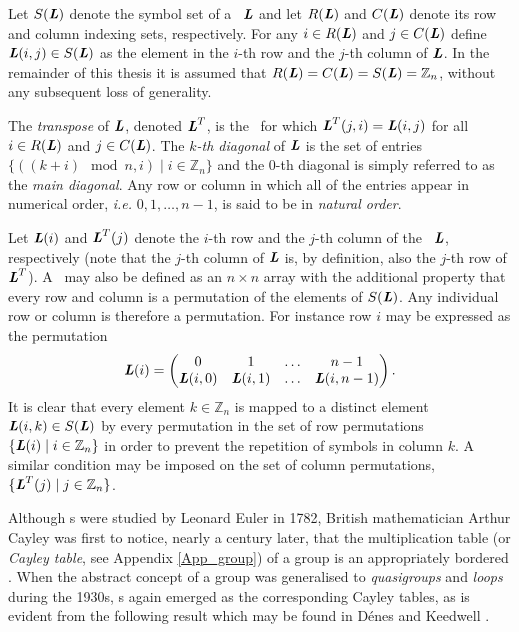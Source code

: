 Let $S(\mbox{\bf \emph{L}})$ denote the symbol set of a \lat \ $\mbox{\bf \emph{L}}$ and let  $R(\mbox{\bf \emph{L}})$ and $ C(\mbox{\bf \emph{L}})$ denote its row and column indexing sets, respectively.   For any $i \in R(\mbox{\bf \emph{L}})$ and $j \in C(\mbox{\bf \emph{L}})$ define $\mbox{\bf \emph{L}}(i,j) \in S(\mbox{\bf \emph{L}})$ as the element in the $i$-th row and the $j$-th column of $\mbox{\bf \emph{L}}$. In the remainder of this thesis it is assumed that  $R(\mbox{\bf \emph{L}})= C(\mbox{\bf \emph{L}})=S(\mbox{\bf \emph{L}}) = \mathbb{Z}_n$, without any subsequent loss of generality. 

The \emph{transpose} of $\mbox{\bf \emph{L}}$, denoted $\mbox{\bf \emph{L}}^T$, is the \lat \ for which $\mbox{\bf \emph{L}}^T(j,i) = \mbox{\bf \emph{L}}(i,j)$ for all $i\in R(\mbox{\bf \emph{L}})$ and $j\in C(\mbox{\bf \emph{L}})$. The \emph{$k$-th  diagonal} of $\mbox{\bf \emph{L}}$ is   the set of entries $\{((k+i) \mod{n} , i) \mid i \in \mathbb{Z}_n \}$ and the $0$-th diagonal is simply referred to as the \emph{main diagonal}. Any row or column in which all of the entries appear in numerical order, \emph{i.e.} $0, 1, \ldots, n-1$, is said to be in  \emph{natural order}.

Let $\mbox{\bf \emph{L}}(i)$ and $\mbox{\bf \emph{L}}^T(j)$ denote the $i$-th row and the $j$-th column of the \lat \ $\mbox{\bf \emph{L}}$, respectively (note that the $j$-th column of $\mbox{\bf \emph{L}}$ is, by definition, also the  $j$-th row of $\mbox{\bf \emph{L}}^T$). A \lat \ may also be  defined as an $n\times n$ array with the additional property that every row and column is a permutation of the elements of $S(\mbox{\bf \emph{L}})$.  Any individual row or column is therefore a permutation. For instance row $i$ may be expressed as the permutation
\[ \mbox{\bf \emph{L}}(i) = \left( 
\begin{matrix}
0 & 1 & \ldots& n-1\\
\mbox{\bf \emph{L}}(i,0) &\mbox{\bf \emph{L}}(i,1) &\ldots &\mbox{\bf \emph{L}}(i,n-1)
\end{matrix} \right). \] 
It is clear that every element $k \in \mathbb{Z}_n$ is mapped to a distinct element $\mbox{\bf \emph{L}}(i,k) \in S(\mbox{\bf \emph{L}})$ by every permutation in the set of row permutations $\{\mbox{\bf \emph{L}}(i) \mid i\in \mathbb{Z}_n\}$ in order to prevent the repetition of symbols in column $k$. A similar condition may be imposed on the set of column permutations, $\{\mbox{\bf \emph{L}}^T(j) \mid j\in \mathbb{Z}_n\}$.

Although \lat s were studied by Leonard Euler in 1782, British mathematician Arthur Cayley was first to notice, nearly a century later, that the multiplication table (or \emph{Cayley table}, see Appendix \ref{App_group}) of a group is an appropriately bordered \lat. When the abstract concept of a group was generalised to \emph{quasigroups} and \emph{loops} during the 1930s, \lat s again emerged as the corresponding Cayley tables, as is evident from the following result which may  be found in D\'{e}nes and Keedwell {\cite[Theorem 1.1.1]{Denes1}}.

